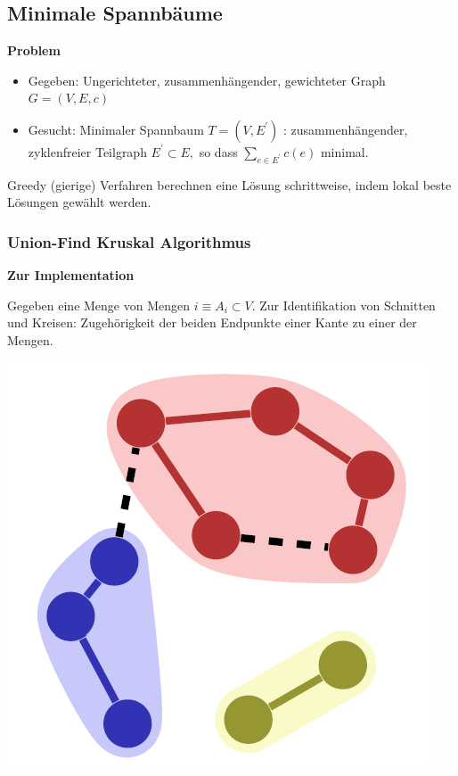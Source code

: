 \begin{sectionbox}
\subsection{Minimale Spannbäume}\smallskip
\textbf{Problem}\par
\begin{itemize}
    \item Gegeben: Ungerichteter, zusammenhängender, gewichteter Graph $G=(V, E, c)$
    \item Gesucht: Minimaler Spannbaum $T=\left(V, E^{\prime}\right)$ : zusammenhängender, zyklenfreier Teilgraph $E^{\prime} \subset E,$ so dass $\sum_{e \in E^{\prime}} c(e)$ minimal.
\end{itemize}
Greedy (gierige) Verfahren berechnen eine Lösung schrittweise, indem lokal beste Lösungen gewählt werden.\par\vspace{10px}

\subsubsection{Union-Find Kruskal Algorithmus}\smallskip
\textbf{Zur Implementation}\par
Gegeben eine Menge von Mengen $i \equiv A_{i} \subset V$. Zur Identifikation von Schnitten und Kreisen: Zugehörigkeit der beiden Endpunkte einer Kante zu einer der Mengen.\par
\begin{center}
    \includegraphics[width = 0.35\columnwidth]{../img/MST_Sym.png}\par
\end{center}\smallskip


\end{sectionbox}
